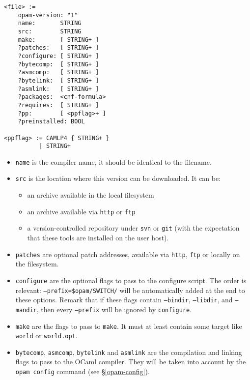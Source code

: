 \documentclass[a4paper,11pt]{article}
\begin{document}
{
\begin{Verbatim}[frame=single]
<file> :=
    opam-version: "1"
    name:       STRING
    src:        STRING
    make:       [ STRING+ ]
    ?patches:   [ STRING+ ]
    ?configure: [ STRING+ ]
    ?bytecomp:  [ STRING+ ]
    ?asmcomp:   [ STRING+ ]
    ?bytelink:  [ STRING+ ]
    ?asmlink:   [ STRING+ ]
    ?packages:  <cnf-formula>
    ?requires:  [ STRING+ ]
    ?pp:        [ <ppflag>+ ]
    ?preinstalled: BOOL

<ppflag> := CAMLP4 { STRING+ }
          | STRING+
\end{Verbatim}
}
\begin{itemize}

\item {\tt name} is the compiler name, it should be identical to the filename.
\item {\tt src} is the location where this version can be downloaded. It can be:
\begin{itemize}
\item an archive available in the local filesystem
\item an archive available via {\tt http} or {\tt ftp}
\item a version-controlled repository under {\tt svn} or {\tt git}
  (with the expectation that these tools are installed on the user host).
\end{itemize}

\item {\tt patches} are optional patch addresses, available via {\tt http}, {\tt ftp}
  or locally on the filesystem.

\item {\tt configure} are the optional flags to pass to the configure
  script. The order is relevant: {\tt --prefix=\$opam/SWITCH/} will be automatically
  added at the end to these options.
  Remark that if these flags contain {\tt --bindir}, {\tt --libdir},
  and {\tt --mandir}, then every {\tt --prefix} will be ignored by {\tt configure}.

\item {\tt make} are the flags to pass to {\tt make}.
  It must at least contain some target like {\tt world} or {\tt world.opt}.

\item {\tt bytecomp}, {\tt asmcomp}, {\tt bytelink} and {\tt asmlink}
  are the compilation and linking flags to pass to the OCaml
  compiler. They will be taken into account by the \verb+opam config+
  command (see \S\ref{opam-config}).


\end{itemize}
\end{document}
